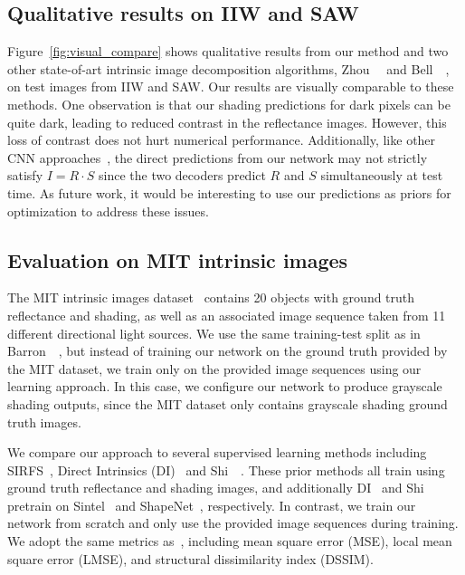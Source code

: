 \documentclass[10pt,twocolumn,letterpaper]{article}
\begin{document}
\subsection{Qualitative results on IIW and SAW}
Figure~\ref{fig:visual_compare} shows qualitative results from our
method and two other state-of-art intrinsic image decomposition
algorithms, Zhou~\etal~\cite{zhou2015learning} and
Bell~\etal~\cite{bell2014intrinsic}, on test images from IIW and SAW.
Our results are visually comparable to these methods. One observation
is that our shading predictions for dark pixels can be quite dark,
leading to reduced contrast in the reflectance images. However, this loss of contrast does not hurt numerical performance. Additionally, like other CNN approaches~\cite{narihira2015direct, shi2016learning}, the direct predictions from our network may not strictly satisfy $I = R \cdot S$ since the two decoders predict $R$ and $S$ simultaneously at test time.  As future work, it would be interesting to use our predictions as priors for optimization to
address these issues.

\subsection{Evaluation on MIT intrinsic images}
The MIT intrinsic images dataset~\cite{grosse2009ground} contains 20
objects with ground truth reflectance and shading, as well as an
associated image sequence taken from 11 different directional light
sources. We use the same training-test split as in
Barron~\etal~\cite{barron2015shape}, but instead of training our
network on the ground truth provided by the MIT dataset, we train only
on the provided image sequences using our learning approach.
In this case, we configure our network to produce grayscale shading
outputs, since the MIT dataset only contains grayscale shading ground
truth images.


We compare our approach to several supervised learning methods
including SIRFS~\cite{barron2015shape}, Direct Intrinsics
(DI)~\cite{narihira2015direct} and Shi~\etal~\cite{shi2016learning}.
These prior methods all train using ground truth reflectance and
shading images, and additionally DI~\cite{narihira2015direct} and
Shi~\etal~\cite{shi2016learning} pretrain
on Sintel~\cite{Butler:ECCV:2012} and
ShapeNet~\cite{chang2015shapenet}, respectively. In contrast,
we train our network from scratch and only use the provided image
sequences
during training. We adopt the same metrics as~\cite{shi2016learning},
including mean square error (MSE), local mean square error (LMSE), and
structural dissimilarity index (DSSIM).
\end{document}
